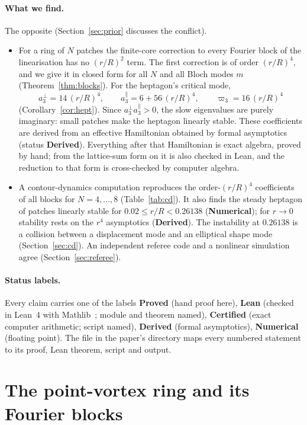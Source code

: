 \documentclass[11pt]{article}
\theoremstyle{definition}
\theoremstyle{remark}
\newcommand{\code}[1]{\path{#1}}
\begin{document}
\paragraph{What we find.} The opposite (Section~\ref{sec:prior} discusses the conflict).
\begin{itemize}
\item For a ring of $N$ patches the finite-core correction to every Fourier block of the linearisation has no $(r/R)^2$
term. The first correction is of order $(r/R)^4$, and we give it in closed form for all $N$ and all Bloch modes $m$
(Theorem~\ref{thm:blocks}). For the heptagon's critical mode,
\[ a^\perp_3=14\,(r/R)^4,\qquad a^\parallel_3=6+56\,(r/R)^4,\qquad \varpi_3=16\,(r/R)^4 \]
(Corollary~\ref{cor:hept}). Since $a^\perp_3a^\parallel_3>0$, the slow eigenvalues are purely imaginary: small patches make the
heptagon linearly stable. These coefficients are derived from an effective Hamiltonian obtained by formal asymptotics
(status \textbf{Derived}). Everything after that Hamiltonian is exact algebra, proved by hand; from the lattice-sum form on it is also checked in
Lean, and the reduction to that form is cross-checked by computer algebra.
\item A contour-dynamics computation reproduces the order-$(r/R)^4$ coefficients of all blocks for $N=4,\dots,8$
(Table~\ref{tab:cd}). It also finds the steady heptagon of patches linearly stable for $0.02\le r/R<0.26138$ (\textbf{Numerical}); for
$r\to0$ stability rests on the $r^4$ asymptotics (\textbf{Derived}). The instability at $0.26138$ is a collision between a
displacement mode and an elliptical shape mode (Section~\ref{sec:cd}). An independent referee code and a nonlinear
simulation agree (Section~\ref{sec:referee}).
\end{itemize}

\paragraph{Status labels.} Every claim carries one of the labels \textbf{Proved} (hand proof here), \textbf{Lean} (checked in
Lean~4 with Mathlib~\cite{Mathlib}; module and theorem named), \textbf{Certified} (exact computer arithmetic; script named),
\textbf{Derived} (formal asymptotics), \textbf{Numerical} (floating point). The file \code{README.md} in the paper's directory
maps every numbered statement to its proof, Lean theorem, script and output.

\section{The point-vortex ring and its Fourier blocks}\label{sec:pv}
\end{document}

